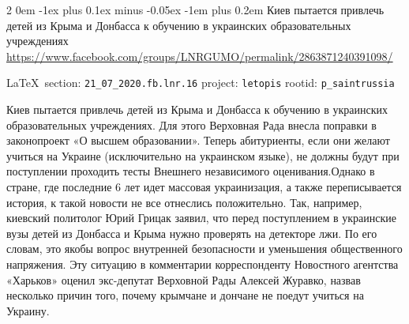 \documentclass[a4paper,11pt]{extreport}
\makeatletter
\renewcommand\subsection{%
  \clearpage
    \@startsection{subsection}%
    {2}%
    {0em}%
    {-1ex plus 0.1ex minus -0.05ex}%
    {-1em plus 0.2em}%
    {\scshape\bfseries\Large}%
}
\makeatother
\begin{document}
  
 
 
\subsection{Киев пытается привлечь детей из Крыма и Донбасса к обучению в украинских образовательных учреждениях}
\label{sec:21_07_2020.fb.lnr.16}
\url{https://www.facebook.com/groups/LNRGUMO/permalink/2863871240391098/}
  
\vspace{0.5cm}
{\small\LaTeX~section: \verb|21_07_2020.fb.lnr.16| project: \verb|letopis| rootid: \verb|p_saintrussia|}
\vspace{0.5cm}
  
Киев пытается привлечь детей из Крыма и Донбасса к обучению в украинских
образовательных учреждениях. Для этого Верховная Рада внесла поправки в
законопроект «О высшем образовании». Теперь абитуриенты, если они желают
учиться на Украине (исключительно на украинском языке), не должны будут при
поступлении проходить тесты Внешнего независимого оценивания.Однако в стране,
где последние 6 лет идет массовая украинизация, а также переписывается история,
к такой новости не все отнеслись положительно. Так, например, киевский
политолог Юрий Грицак заявил, что перед поступлением в украинские вузы детей из
Донбасса и Крыма нужно проверять на детекторе лжи. По его словам, это якобы
вопрос внутренней безопасности и уменьшения общественного напряжения. Эту
ситуацию в комментарии корреспонденту Новостного агентства «Харьков» оценил
экс-депутат Верховной Рады Алексей Журавко, назвав несколько причин того,
почему крымчане и дончане не поедут учиться на Украину.
\end{document}
